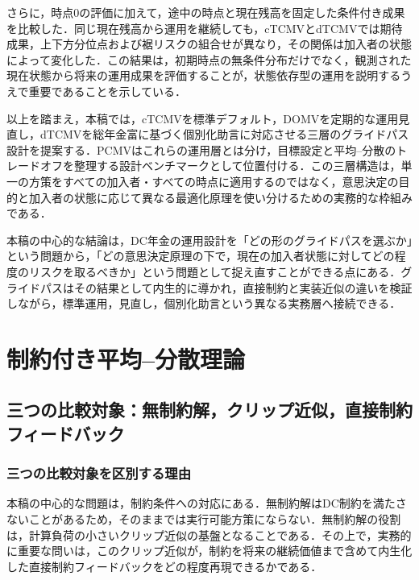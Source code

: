 \documentclass[10pt,a4paper]{article}
\theoremstyle{plain}
\theoremstyle{definition}
\begin{document}
さらに，時点0の評価に加えて，途中の時点と現在残高を固定した条件付き成果を比較した．同じ現在残高から運用を継続しても，cTCMVとdTCMVでは期待成果，上下方分位点および裾リスクの組合せが異なり，その関係は加入者の状態によって変化した．この結果は，初期時点の無条件分布だけでなく，観測された現在状態から将来の運用成果を評価することが，状態依存型の運用を説明するうえで重要であることを示している．

以上を踏まえ，本稿では，cTCMVを標準デフォルト，DOMVを定期的な運用見直し，dTCMVを総年金富に基づく個別化助言に対応させる三層のグライドパス設計を提案する．PCMVはこれらの運用層とは分け，目標設定と平均--分散のトレードオフを整理する設計ベンチマークとして位置付ける．この三層構造は，単一の方策をすべての加入者・すべての時点に適用するのではなく，意思決定の目的と加入者の状態に応じて異なる最適化原理を使い分けるための実務的な枠組みである．

本稿の中心的な結論は，DC年金の運用設計を「どの形のグライドパスを選ぶか」という問題から，「どの意思決定原理の下で，現在の加入者状態に対してどの程度のリスクを取るべきか」という問題として捉え直すことができる点にある．グライドパスはその結果として内生的に導かれ，直接制約と実装近似の違いを検証しながら，標準運用，見直し，個別化助言という異なる実務層へ接続できる．

\FloatBarrier\clearpage\appendix
\small
\setlength{\abovedisplayskip}{4pt plus 1pt}
\setlength{\belowdisplayskip}{4pt plus 1pt}

\section{制約付き平均--分散理論}
\label{sec:theory}

\subsection{三つの比較対象：無制約解，クリップ近似，直接制約フィードバック}
\label{sec:strict-clip}

\subsubsection{三つの比較対象を区別する理由}

本稿の中心的な問題は，制約条件への対応にある．無制約解はDC制約を満たさないことがあるため，そのままでは実行可能方策にならない．無制約解の役割は，計算負荷の小さいクリップ近似の基盤となることである．その上で，実務的に重要な問いは，このクリップ近似が，制約を将来の継続価値まで含めて内生化した直接制約フィードバックをどの程度再現できるかである．
\end{document}
